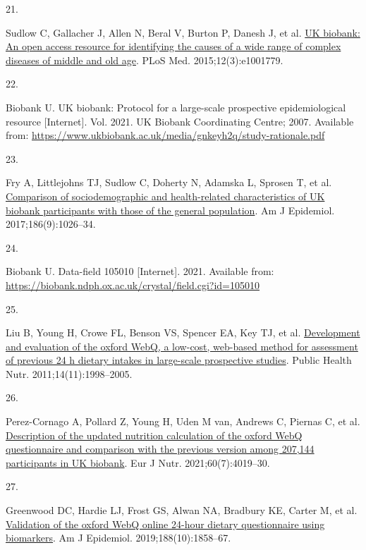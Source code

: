\documentclass[
  11pt,
  a4paper,
  DIV=11,
  numbers=noendperiod,
  twocolumn]{scrartcl}
\newlength{\cslhangindent}
\newlength{\csllabelwidth}
\newlength{\cslentryspacingunit} %
\newenvironment{CSLReferences}[2] %
 {%
  \setlength{\parindent}{0pt}
  \ifodd #1
  \let\oldpar\par
  \def\par{\hangindent=\cslhangindent\oldpar}
  \fi
  \setlength{\parskip}{#2\cslentryspacingunit}
 }%
 {}
\newcommand{\CSLLeftMargin}[1]{\parbox[t]{\csllabelwidth}{#1}}
\newcommand{\CSLRightInline}[1]{\parbox[t]{\linewidth - \csllabelwidth}{#1}\break}
\begin{document}
\begin{CSLReferences}{0}{0}
\leavevmode{}%
\CSLLeftMargin{21. }%
\CSLRightInline{Sudlow C, Gallacher J, Allen N, Beral V, Burton P,
Danesh J, et al. \href{https://doi.org/10.1371/journal.pmed.1001779}{UK
biobank: An open access resource for identifying the causes of a wide
range of complex diseases of middle and old age}. PLoS Med.
2015;12(3):e1001779. }

\leavevmode{}%
\CSLLeftMargin{22. }%
\CSLRightInline{Biobank U. UK biobank: Protocol for a large-scale
prospective epidemiological resource {[}Internet{]}. Vol. 2021. UK
Biobank Coordinating Centre; 2007. Available from:
\url{https://www.ukbiobank.ac.uk/media/gnkeyh2q/study-rationale.pdf}}

\leavevmode{}%
\CSLLeftMargin{23. }%
\CSLRightInline{Fry A, Littlejohns TJ, Sudlow C, Doherty N, Adamska L,
Sprosen T, et al. \href{https://doi.org/10.1093/aje/kwx246}{Comparison
of sociodemographic and health-related characteristics of UK biobank
participants with those of the general population}. Am J Epidemiol.
2017;186(9):1026--34. }

\leavevmode{}%
\CSLLeftMargin{24. }%
\CSLRightInline{Biobank U. Data-field 105010 {[}Internet{]}. 2021.
Available from:
\url{https://biobank.ndph.ox.ac.uk/crystal/field.cgi?id=105010}}

\leavevmode{}%
\CSLLeftMargin{25. }%
\CSLRightInline{Liu B, Young H, Crowe FL, Benson VS, Spencer EA, Key TJ,
et al. \href{https://doi.org/10.1017/s1368980011000942}{Development and
evaluation of the oxford WebQ, a low-cost, web-based method for
assessment of previous 24 h dietary intakes in large-scale prospective
studies}. Public Health Nutr. 2011;14(11):1998--2005. }

\leavevmode{}%
\CSLLeftMargin{26. }%
\CSLRightInline{Perez-Cornago A, Pollard Z, Young H, Uden M van, Andrews
C, Piernas C, et al.
\href{https://doi.org/10.1007/s00394-021-02558-4}{Description of the
updated nutrition calculation of the oxford WebQ questionnaire and
comparison with the previous version among 207,144 participants in UK
biobank}. Eur J Nutr. 2021;60(7):4019--30. }

\leavevmode{}%
\CSLLeftMargin{27. }%
\CSLRightInline{Greenwood DC, Hardie LJ, Frost GS, Alwan NA, Bradbury
KE, Carter M, et al.
\href{https://doi.org/10.1093/aje/kwz165}{Validation of the oxford WebQ
online 24-hour dietary questionnaire using biomarkers}. Am J Epidemiol.
2019;188(10):1858--67. }


\end{CSLReferences}
\end{document}
